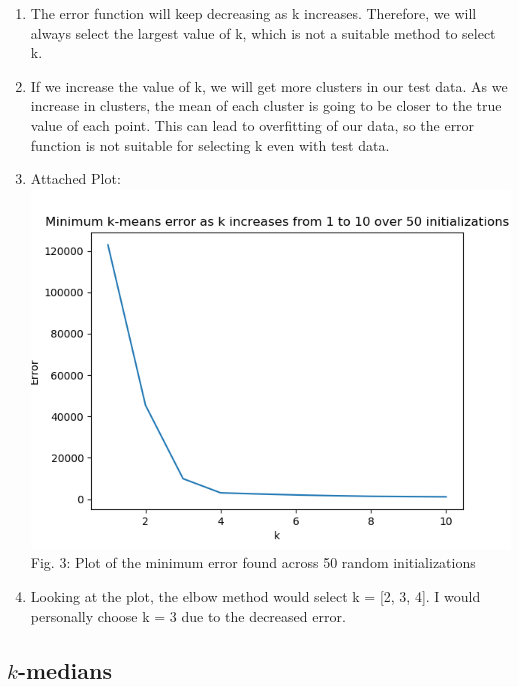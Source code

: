 \documentclass{article}
\def\enum#1{\begin{enumerate}#1\end{enumerate}}
\begin{document}
\enum{
 \item The error function will keep decreasing as k increases. Therefore, we will always select the largest value of k, which is not a suitable method to select k.
 \item If we increase the value of k, we will get more clusters in our test data. As we increase in clusters, the mean of each cluster is going to be closer to the true value of each point. This can lead to overfitting of our data, so the error function is not suitable for selecting k even with test data. 
 \item Attached Plot: \\
  \includegraphics[scale=0.6]{../figs/kmeans_errors.png} \\ 
   Fig. 3: Plot of the minimum error found across 50 random initializations 
 \item Looking at the plot, the elbow method would select k = [2, 3, 4]. I would personally choose k = 3 due to the decreased error.
 }

 \subsection{$k$-medians}
\end{document}
